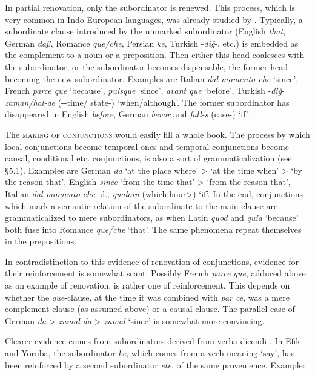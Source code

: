 In partial renovation, only the subordinator is renewed. This process, which is very common in Indo-European languages, was already studied by \citet{Meillet1915}. Typically, a subordinate clause introduced by the unmarked subordinator (English \textit{that}, German \textit{daß}, Romance \textit{que/che}, Persian \textit{ke}, Turkish -\textit{diğ}{}-, etc.) is embedded as the complement to a noun or a preposition. Then either this head coalesces with the subordinator, or the subordinator becomes dispensable, the former head becoming the new subordinator. Examples are Italian \textit{dal momento che} ‘since’, French \textit{parce que} ‘because’, \textit{puisque} ‘since’, \textit{avant que} ‘before’, Turkish -\textit{diğ}-\glposs \textit{zaman/hal-de} (-\nr-\glposs time/ state-\glloc) ‘when/although’. The former subordinator has disappeared in English \textit{before}, German \textit{bevor} and \textit{fall-s} (case-\advr) ‘if’.

The \textsc{making of conjunctions} would easily fill a whole book. The process by which local conjunctions become temporal ones and temporal conjunctions become causal, conditional etc. conjunctions, is also a sort of grammaticalization (see §5.1). Examples are German \textit{da} ‘at the place where’ {\textgreater} ‘at the time when’ {\textgreater} ‘by the reason that’, English \textit{since} ‘from the time that’ {\textgreater} ‘from the reason that’, Italian \textit{dal momento che} id., \textit{qualora} (which:hour{\textgreater}) ‘if’.\label{page70} In the end, conjunctions which mark a semantic relation of the subordinate to the main clause are grammaticalized to mere subordinators, as when Latin \textit{quod} and \textit{quia} ‘because’ both fuse into Romance \textit{que/che} ‘that’. The same phenomena repeat themselves in the prepositions.

In contradistinction to this evidence of renovation of conjunctions, evidence for their reinforcement is somewhat scant. Possibly French \textit{parce que}, adduced above as an example of renovation, is rather one of reinforcement. This depends on whether the \textit{que}{}-clause, at the time it was combined with \textit{par ce}, was a mere complement clause (as assumed above) or a causal clause. The parallel case of German \textit{da} {\textgreater} \textit{zumal da} {\textgreater} \textit{zumal} ‘since’ is somewhat more convincing.

Clearer evidence comes from subordinators derived from verba dicendi \citep[183]{Lord1976}. In Efik and Yoruba, the subordinator \textit{ke}, which comes from a verb meaning ‘say’, has been reinforced by a second subordinator \textit{ete}, of the same provenience. Example:

